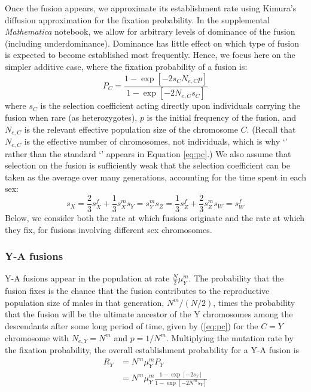 Once the fusion appears, we approximate its establishment rate using Kimura's \citeyearpar{Kimura1962} diffusion approximation for the fixation probability. In the supplemental \emph{Mathematica} notebook, we allow for arbitrary levels of dominance of the fusion (including underdominance). Dominance has little effect on which type of fusion is expected to become established most frequently. Hence, we focus here on the simpler additive case, where the fixation probability of a fusion is:
\begin{equation}\label{eq:pc}
P_C = \frac{\text{1} - \exp[-\text{2}s_C N_{e,C}p]}{\text{1} - \exp[-\text{2}N_{e,C}s_C ]}
\end{equation}
where $s_C$ is the selection coefficient acting directly upon individuals carrying the fusion when rare (as heterozygotes), $p$ is the initial frequency of the fusion, and $N_{e,C}$ is the relevant effective population size of the chromosome $C$. (Recall that $N_{e,C}$ is the effective number of chromosomes, not individuals, which is why `' rather than the standard `' appears in Equation \ref{eq:pc}.) We also assume that selection on the fusion is sufficiently weak that the selection coefficient can be taken as the average over many generations, accounting for the time spent in each sex:
\begin{subequations}
\begin{equation}
s_X = \frac{\text{2}}{\text{3}}s^f_X + \frac{\text{1}}{\text{3}}s^m_X
\end{equation}
\begin{equation}
s_Y = s^m_Y
\end{equation}
\begin{equation}
s_Z = \frac{\text{1}}{\text{3}}s^f_Z + \frac{\text{2}}{\text{3}}s^m_Z
\end{equation}
\begin{equation}
s_W = s^f_W
\end{equation}
\end{subequations}
Below, we consider both the rate at which fusions originate and the rate at which they fix, for fusions involving different sex chromosomes.

\subsubsection{Y-A fusions}

Y-A fusions appear in the population at rate $\frac{N}{\text{2}}\mu^m_Y$. The probability that the fusion fixes is the chance that the fusion contributes to the reproductive population size of males in that generation, $N^m / (N/\text{2})$, times the probability that the fusion will be the ultimate ancestor of the Y chromosomes among the descendants after some long period of time, given by (\ref{eq:pc}) for the $C = Y$ chromosome with $N_{e,Y}=N^m$ and $p=\text{1}/N^m$. Multiplying the mutation rate by the fixation probability, the overall establishment probability for a Y-A fusion is
\begin{align}\label{eq:Ry}
R_Y &= N^m \mu^m_Y  P_Y \nonumber \\
&= N^m \mu^m_Y \frac{\text{1}-\exp[-\text{2}s_Y]}{\text{1}-\exp[-\text{2}N^ms_Y]}
\end{align}

